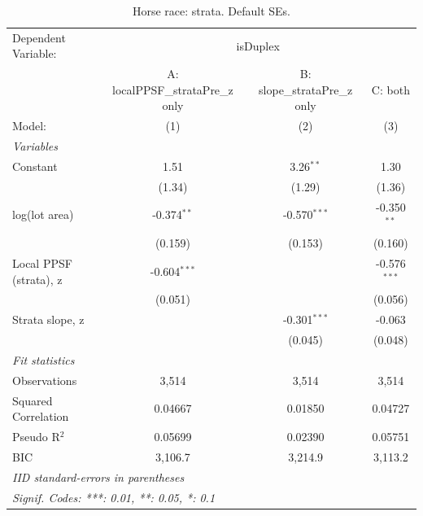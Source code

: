 
\begin{table}[htbp]
   \caption{\label{tab:horseRace_strata_default} Horse race: strata. Default SEs.}
   \centering
   \begin{tabular}{lccc}
      \tabularnewline \midrule \midrule
      Dependent Variable: & \multicolumn{3}{c}{isDuplex}\\
                             & A: localPPSF\_strataPre\_z only   & B: slope\_strataPre\_z only   & C: both \\   
      Model:                 & (1)                               & (2)                           & (3)\\  
      \midrule
      \emph{Variables}\\
      Constant               & 1.51                              & 3.26$^{**}$                   & 1.30\\   
                             & (1.34)                            & (1.29)                        & (1.36)\\   
      log(lot area)          & -0.374$^{**}$                     & -0.570$^{***}$                & -0.350$^{**}$\\   
                             & (0.159)                           & (0.153)                       & (0.160)\\   
      Local PPSF (strata), z & -0.604$^{***}$                    &                               & -0.576$^{***}$\\   
                             & (0.051)                           &                               & (0.056)\\   
      Strata slope, z        &                                   & -0.301$^{***}$                & -0.063\\   
                             &                                   & (0.045)                       & (0.048)\\   
      \midrule
      \emph{Fit statistics}\\
      Observations           & 3,514                             & 3,514                         & 3,514\\  
      Squared Correlation    & 0.04667                           & 0.01850                       & 0.04727\\  
      Pseudo R$^2$           & 0.05699                           & 0.02390                       & 0.05751\\  
      BIC                    & 3,106.7                           & 3,214.9                       & 3,113.2\\  
      \midrule \midrule
      \multicolumn{4}{l}{\emph{IID standard-errors in parentheses}}\\
      \multicolumn{4}{l}{\emph{Signif. Codes: ***: 0.01, **: 0.05, *: 0.1}}\\
   \end{tabular}
\end{table}


